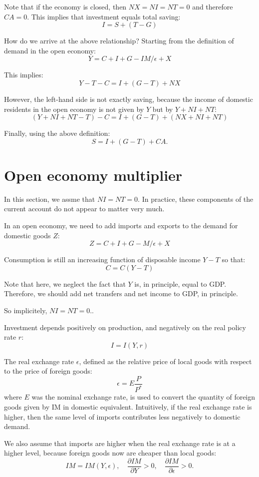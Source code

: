 \documentclass[]{book}
\theoremstyle{definition}
\theoremstyle{definition}
\theoremstyle{definition}
\theoremstyle{remark}
\begin{document}
Note that if the economy is closed, then \(NX=NI=NT=0\) and therefore
\(CA=0\). This implies that investment equals total saving:
\[I=S+\left(T-G\right)\]

How do we arrive at the above relationship? Starting from the definition
of demand in the open economy: \[Y=C+I+G-IM/\epsilon+X\]

This implies: \[Y-T-C=I+\left(G-T\right)+NX\]

However, the left-hand side is not exactly saving, because the income of
domestic residents in the open economy is not given by \(Y\) but by
\(Y+NI+NT\):
\[\left(Y+NI+NT-T\right)-C=I+\left(G-T\right)+\left(NX+NI+NT\right)\]

Finally, using the above definition: \[S=I+\left(G-T\right)+CA.\]

\section{Open economy multiplier}\label{open-economy-multiplier}

In this section, we assme that \(NI = NT = 0\). In practice, these
components of the current account do not appear to matter very much.

In an open economy, we need to add imports and exports to the demand for
domestic goods \(Z\): \[Z=C+I+G-M/\epsilon+X\]

Consumption is still an increasing function of disposable income \(Y-T\)
so that: \[C=C\left(Y-T\right)\]

Note that here, we neglect the fact that \(Y\) is, in principle, equal
to GDP. Therefore, we should add net transfers and net income to GDP, in
principle.

So implicitely, \(NI=NT=0\)..

Investment depends positively on production, and negatively on the real
policy rate \(r\): \[I=I\left(Y,r\right)\]

The real exchange rate \(\epsilon\), defined as the relative price of
local goods with respect to the price of foreign goods:
\[\epsilon=E\frac{P}{P^{*}}\] where \(E\) was the nominal exchange rate,
is used to convert the quantity of foreign goods given by IM in domestic
equivalent. Intuitively, if the real exchange rate is higher, then the
same level of imports contributes less negatively to domestic demand.

We also assume that imports are higher when the real exchange rate is at
a higher level, because foreign goods now are cheaper than local goods:
\[IM=IM\left(Y,\epsilon\right),\quad\frac{\partial IM}{\partial Y}>0,\quad\frac{\partial IM}{\partial\epsilon}>0.\]
\end{document}

